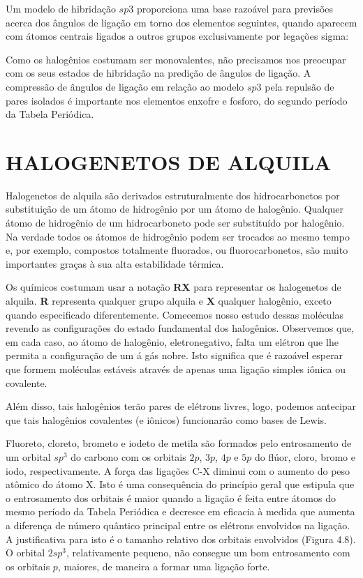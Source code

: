 Um modelo de hibridação $sp3$ proporciona uma base razoável para previsões acerca dos ângulos de ligação em torno dos elementos seguintes, quando aparecem com átomos centrais ligados a outros grupos exclusivamente por legações sigma:

Como os halogênios costumam ser monovalentes, não precisamos nos preocupar com os seus estados de hibridação na predição de ângulos de ligação. A compressão de ângulos de ligação em relação ao modelo $sp3$ pela repulsão de pares isolados é importante nos elementos enxofre e fosforo, do segundo período da Tabela Periódica.

\section{HALOGENETOS DE ALQUILA}

Halogenetos de alquila são derivados estruturalmente dos hidrocarbonetos por substituição de um átomo de hidrogênio por um átomo de halogênio. Qualquer átomo de hidrogênio de um hidrocarboneto pode ser substituído por halogênio. Na verdade todos os átomos de hidrogênio podem ser trocados ao mesmo tempo e, por exemplo, compostos totalmente fluorados, ou fluorocarbonetos, são muito importantes graças à sua alta estabilidade térmica. 

Os químicos costumam usar a notação \textbf{RX} para representar os halogenetos de alquila. \textbf{R} representa qualquer grupo alquila e \textbf{X} qualquer halogênio, exceto quando especificado diferentemente. Comecemos nosso estudo dessas moléculas revendo as configurações do estado fundamental dos halogênios. Observemos que, em cada caso, ao átomo de halogênio, eletronegativo, falta um elétron que lhe permita a configuração de um á gás nobre. Isto significa que é razoável esperar que formem moléculas estáveis através de apenas uma ligação simples iônica ou covalente.

Além disso, tais halogênios terão pares de elétrons livres, logo, podemos antecipar que tais halogênios covalentes (e iônicos) funcionarão como bases de Lewis.

Fluoreto, cloreto, brometo e iodeto de metila são formados pelo entrosamento de um orbital $sp^3$ do carbono com os orbitais $2p$, $3p$, $4p$ e $5p$ do flúor, cloro, bromo e iodo, respectivamente. A força das ligações C-X diminui com o aumento do peso atômico do átomo X. Isto é uma consequência do princípio geral que estipula que o entrosamento dos orbitais é maior quando a ligação é feita entre átomos do mesmo período da Tabela Periódica e decresce em eficacia à medida que aumenta a diferença de número quântico principal entre os elétrons envolvidos na ligação. A justificativa para isto é o tamanho relativo dos orbitais envolvidos (Figura 4.8). O orbital $2sp^3$, relativamente pequeno, não consegue um bom entrosamento com os orbitais $p$, maiores, de maneira a formar uma ligação forte.

